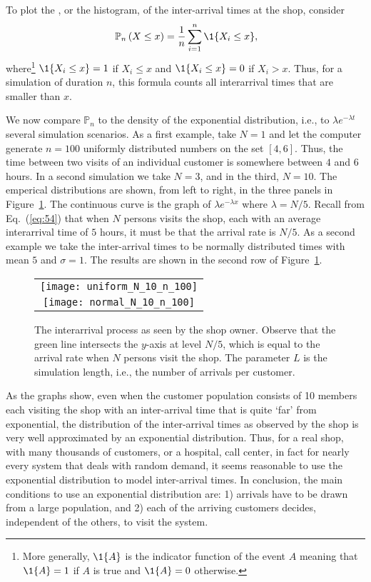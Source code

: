 To plot the , or the histogram,
of the inter-arrival times at the shop, consider
\begin{equation*}
  \PP{n}{X \leq x} = \frac1n\sum_{i=1}^n \1{X_i\leq x},
\end{equation*}
where\footnote{More generally, $\1{A}$ is the indicator function of
  the event $A$ meaning that $\1{A}=1$ if $A$ is true and $\1{A}=0$
  otherwise.} $\1{X_i\leq x}=1$ if $X_i\leq x$ and $\1{X_i\leq x}=0$
if $X_i> x$.  Thus, for a simulation of duration $n$, this formula
counts all interarrival times that are smaller than $x$.  

We now compare $\mathbb{P}_n$ to the density of the exponential
distribution, i.e., to $\lambda e^{-\lambda t}$ several simulation
scenarios.  As a first example, take $N=1$ and let the computer
generate $n=100$ uniformly distributed numbers on the set $[4,
6]$.
Thus, the time between two visits of an individual customer is
somewhere between $4$ and $6$ hours. In a second simulation we take
$N=3$, and in the third, $N=10$. The emperical distributions are
shown, from left to right, in the three panels in
Figure~\ref{fig:uniform}. The continuous curve is the graph of
$\lambda e^{-\lambda x}$ where $\lambda = N/5$.  Recall from
Eq.~(\ref{eq:54}) that when $N$ persons visits the shop, each with an
average interarrival time of $5$ hours, it must be that the arrival
rate is $N/5$. As a second example we take the inter-arrival times to
be normally distributed times with mean $5$ and $\sigma=1$. The
results are shown in the second row of Figure~\ref{fig:uniform}.

\begin{figure}[ht]
  \centering
  \begin{tabular}[h]{c}
\texttt{[image: uniform\_N\_10\_n\_100]} \\
\texttt{[image: normal\_N\_10\_n\_100]}
  \end{tabular}
  \caption{The interarrival process as seen by the shop owner. Observe
    that the green line intersects the $y$-axis at level $N/5$, which
    is equal to the arrival rate when $N$ persons visit the shop. The
    parameter $L$ is the simulation length, i.e., the number of
    arrivals per customer.}
  \label{fig:uniform}
\end{figure}

As the graphs show, even when the customer population consists of 10
members each visiting the shop with an inter-arrival time that is
quite `far' from exponential, the distribution of the inter-arrival
times as observed by the shop is very well approximated by an
exponential distribution. Thus, for a real shop, with many thousands
of customers, or a hospital, call center, in fact for nearly every
system that deals with random demand, it seems reasonable to use the
exponential distribution to model inter-arrival times.  In conclusion,
the main conditions to use an exponential distribution are: 1)
arrivals have to be drawn from a large population, and 2) each of the
arriving customers decides, independent of the others, to visit the
system.

